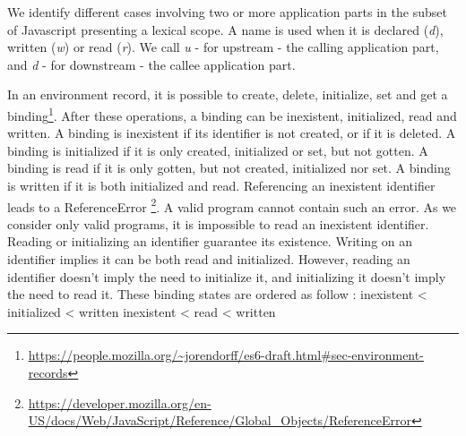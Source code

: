 We identify different cases involving two or more application parts in the subset of Javascript presenting a lexical scope.
A name is used when it is declared (\textit{d}), written (\textit{w}) or read (\textit{r}).
We call \textit{u} - for upstream - the calling application part, and \textit{d} - for downstream - the callee application part.


In an environment record, it is possible to create, delete, initialize, set and get a binding\footnote{\url{https://people.mozilla.org/~jorendorff/es6-draft.html#sec-environment-records}}.
After these operations, a binding can be inexistent, initialized, read and written.
A binding is inexistent if its identifier is not created, or if it is deleted.
A binding is initialized if it is only created, initialized or set, but not gotten.
A binding is read if it is only gotten, but not created, initialized nor set.
A binding is written if it is both initialized and read.
Referencing an inexistent identifier leads to a ReferenceError \footnote{\url{https://developer.mozilla.org/en-US/docs/Web/JavaScript/Reference/Global_Objects/ReferenceError}}.
A valid program cannot contain such an error.
As we consider only valid programs, it is impossible to read an inexistent identifier.
Reading or initializing an identifier guarantee its existence.
Writing on an identifier implies it can be both read and initialized.
However, reading an identifier doesn't imply the need to initialize it, and initializing it doesn't imply the need to read it.
These binding states are ordered as follow :
inexistent < initialized < written
inexistent < read < written





